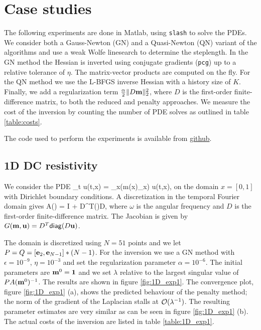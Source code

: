\documentclass{iopart}
\begin{document}
\section{Case studies}
\label{examples}
The following experiments are done in Matlab, using \texttt{slash} to solve the PDEs. We consider both
a Gauss-Newton (GN) and a Quasi-Newton (QN) variant of the algorithms and use a weak Wolfe linesearch
to determine the steplength. In the GN method the Hessian is inverted using 
conjugate gradients (\texttt{pcg}) up to a relative tolerance of $\eta$. The matrix-vector products are computed on the fly.
For the QN method we use the L-BFGS inverse Hessian with a history size of $K$. Finally, we add a regularization term
$\frac{\alpha}{2} \|D\mathbf{m}\|_2^2$, where $D$ is the first-order finite-difference matrix,  to both the reduced and penalty approaches. 
We measure the cost of the inversion by counting the number of PDE solves as outlined in table \ref{table:costs}.

The code used to perform the experiments is available from \url{github}.

\subsection{1D DC resistivity}
We consider the PDE
\bq
\partial_t u(t,x) = \partial_x\left(m(x)\partial_x\right) u(t,x),
\eq
on the domain $x = [0,1]$ with Dirichlet boundary conditions. 
A discretization in the temporal Fourier domain gives
\bq
A() = \imath\omega I + D^T()D,
\eq
where $\omega$ is the angular frequency and $D$ is the first-order finite-difference matrix. 
The Jacobian is given by $G(\mathbf{m},\mathbf{u}) = D^T\mathsf{diag}(D\mathbf{u})$. 

The domain is discretized using $N=51$ points and we let $P = Q = [\mathbf{e}_2, \mathbf{e}_{N-1}]*(N-1)$.
For the inversion we use a GN method with $\epsilon=10^{-9}$, $\eta=10^{-3}$ and set the regularization parameter $\alpha = 10^{-6}$.
The initial parameters are $\mathbf{m}^0 = \mathbf{1}$ and we set $\lambda$ relative to the largest singular value of $PA(\mathbf{m}^0)^{-1}$.
The results are shown in figure \ref{fig:1D_exp1}. The convergence plot, figure \ref{fig:1D_exp1} (a), shows the predicted behaviour of the penalty method; the norm
of the gradient of the Laplacian stalls at $\mathcal{O}(\lambda^{-1})$. The resulting parameter estimates are very similar as can be seen 
in figure \ref{fig:1D_exp1} (b). The actual costs of the inversion are listed in table \ref{table:1D_exp1}.
\end{document}

